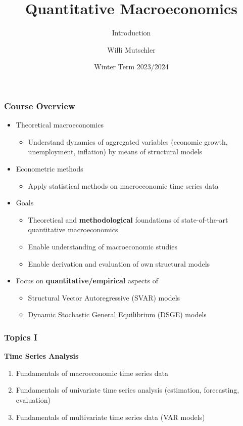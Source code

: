 \documentclass[10pt]{beamer}
\title{Quantitative Macroeconomics}
\subtitle{Introduction}
\author{Willi Mutschler}
\institute{University of Tübingen}
\date{Winter Term 2023/2024}
\begin{document}
\maketitle


\begin{frame}
\frametitle{Course Overview}
\begin{itemize}
  \item Theoretical macroeconomics
  \begin{itemize}
    \item Understand dynamics of aggregated variables (economic growth, unemployment, inflation) by means of structural models
  \end{itemize}
  \item Econometric methods
  \begin{itemize}
    \item Apply statistical methods on macroeconomic time series data
  \end{itemize}
  \item Goals
  \begin{itemize}
    \item Theoretical and \textbf{methodological} foundations of state-of-the-art quantitative macroeconomics
    \item Enable understanding of macroeconomic studies
    \item Enable derivation and evaluation of own structural models
  \end{itemize}
  \item Focus on \textbf{quantitative/empirical} aspects of
  \begin{itemize}
    \item Structural Vector Autoregressive (SVAR) models
    \item Dynamic Stochastic General Equilibrium (DSGE) models
  \end{itemize}
  
\end{itemize}
\end{frame}

\begin{frame}
\frametitle{Topics I}
\textbf{Time Series Analysis}
\begin{enumerate}
    \item Fundamentals of macroeconomic time series data
    \item Fundamentals of univariate time series analysis (estimation, forecasting, evaluation)
    \item Fundamentals of multivariate time series data (VAR models)
\end{enumerate}
\end{frame}
\end{document}
